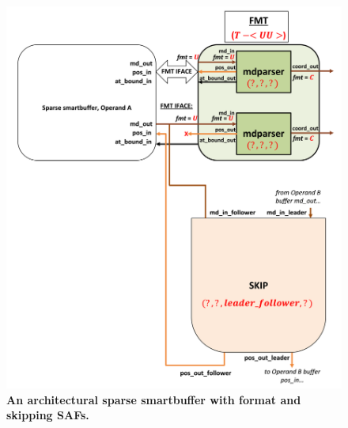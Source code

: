 \begin{figure}[ht]
\includegraphics[width=\textwidth]{figures/safinference_build_04mdparserportfmt.png}
\caption{\textbf{An architectural sparse smartbuffer with format and skipping SAFs.}}
\label{fig:safinference_build_04mdparserportfmt}
\centering
\end{figure}



